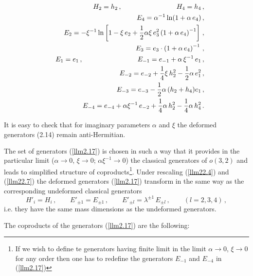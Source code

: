 \documentclass[a4paper,12pt,showkeys]{article}
\begin{document}
\begin{eqnarray}\label{llm2.17}
&& H_2= h_2 \, , \qquad \qquad \qquad\qquad
H_4 = h_4 \, ,
\cr
&&
E_4 =  \alpha^{-1}
 \ln (1 +
\alpha \, e_4 ) \, ,
 \cr
  && E_2 = - \xi^{-1}
 \ln \left[1 -
\xi \, e_2 +
 \frac{1}{2} \alpha \xi  \,
  e^2_3 \left(1 +
\alpha \, e_4
\right)^{-1}\right] \, ,
\cr
&&
 E_3 = e_3 \cdot
\left( 1 +
 \alpha \, e_4
 \right)^{-1} \, ,
 \cr
  &&
  E_1 = e_1 \, ,
\qquad \qquad \qquad\qquad
E_{-1} = e_{-1}  + \alpha \, \xi^{-1} \, e_1\, ,
\cr
 &&
  E_{-2} = e_{-2}
+ \frac{1}{4} \xi \, h^2_2 - \frac{1}{2} \alpha \, e^2_1\, ,
\cr &&
E_{-3} = e_{-3} -
\frac{1}{2} \alpha \,  (h_2 + h_4) e_1 \, ,
\cr &&
E_{-4} = e_{-4}
+ \alpha \xi^{-1}\, e_{-2} +
 \frac{1}{4} \alpha\, h^2_2
  - \frac{1}{4}\alpha \,
h^2_{4} \, .
\end{eqnarray}


It is easy to check that for imaginary parameters $\alpha$ and
$\xi$ the deformed generators (2.14) remain anti-Hermitian.

The set of generators (\ref{llm2.17}) is chosen in such a way that
it provides in the  particular limit ($\alpha \to 0$, $\xi \to 0$;
$\alpha \xi^{-1} \to 0$) the classical generators of $o(3,2 )$
and leads to simplified structure of coproducts\footnote{If we
wish to define te generators having finite limit in  the limit
$\alpha \to 0$, $\xi \to 0$ for any order then one has to redefine
the generators $E_{-1}$ and $E_{-4}$ in (\ref{llm2.17}) }.
Under   rescaling (\ref{llm22.4}) and (\ref{llm22.7}) the deformed
generators (\ref{llm2.17}) transform in the same way as the
corresponding undeformed  classical generators
\begin{equation}\label{llm22.18}
  H'_{i} = H_i \, , \qquad E'_{\pm1} = E_{\pm1} \, , \qquad E'_{\pm l}
  = \lambda^{\pm 1} \, E_{\pm l} \, , \qquad (l =2,3,4)\, ,
\end{equation}
i.e. they have the same mass dimensions as the undeformed generators.

 The coproducts of the
 generators (\ref{llm2.17}) are the following:
\end{document}
